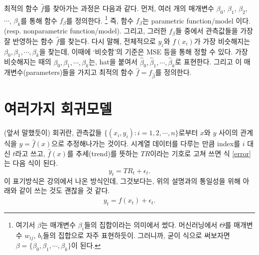 \documentclass{article}
\begin{document}
최적의 함수 \(\hat f\)를 찾아가는 과정은 다음과 같다.
먼저, 여러 개의 매개변수 \(\beta_0\), \(\beta_1\), \(\beta_2\), \(\cdots\), \(\beta_k\)를 통해 함수 \(f_\beta\)를 정의한다.
\footnote{여기서 \(\beta\)는 매개변수 \(\beta_i\)들의 집합이라는 의미에서 썼다.
머신러닝에서 \(\Theta\)를 매개변수 \(w_{ij}\), \(b_i\)들의 집합으로 자주 표현하듯이.
그러니까, 굳이 식으로 써보자면 \(\beta=\{\beta_0,\beta_1,\cdots,\beta_k\}\)이 된다.}
즉, 함수 \(f_\beta\)는 parametric function/model 이다. (resp. nonparametric function/model).
그리고, 그러한 \(f_\beta\)들 중에서 관측값들을 가장 잘 반영하는 함수 \(\hat f\)를 찾는다.
다시 말해, 전체적으로 \(y_i\)와 \(f(x_i)\)가 가장 비슷해지는 \(\beta_0,\beta_1,\cdots,\beta_k\)을 찾는데, 이때에 `비슷함'의 기준은 MSE 등을 통해 정할 수 있다.
가장 비슷해지는 때의 \(\beta_0,\beta_1,\cdots,\beta_k\)는, hat을 붙여서 \(\hat\beta_0,\hat\beta_1,\cdots,\hat\beta_k\)로 표현한다.
그리고 이 매개변수(parameters)들을 가지고 최적의 함수 \(\hat f =  f_{\hat\beta}\)를 정의한다.

\section{여러가지 회귀모델}
(앞서 말했듯이) 회귀란, 관측값들 \(\{(x_i,y_i):i=1,2,\cdots,n\}\)로부터 \(x\)와 \(y\) 사이의 관계식을 \(y=\hat f(x)\)으로 추정해나가는 것이다.
시계열 데이터를 다루는 만큼 index를 \(i\) 대신 \(t\)라고 쓰고, \(\hat f(x)\)를 추세(trend)를 뜻하는 $TR$이라는 기호로 고쳐 쓰면 식 \eqref{error}는 다음 식이 된다.
\[y_t=TR_t+\epsilon_t.\]
이 표기방식은 강의에서 나온 방식인데, 그것보다는, 위의 설명과의 통일성을 위해 아래와 같이 쓰는 것도 괜찮을 것 같다.
\[y_t=\hat f(x_t)+\epsilon_t.\]

\end{document}
